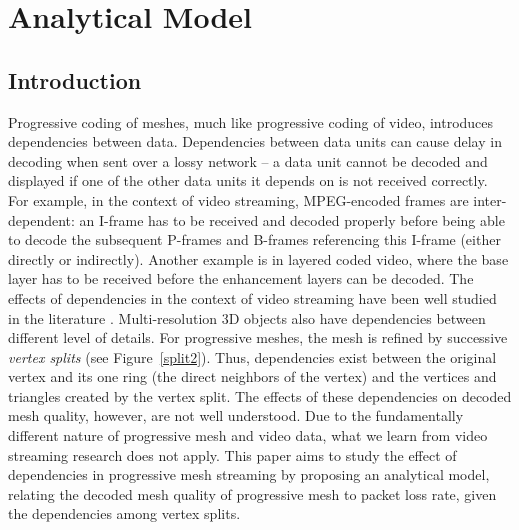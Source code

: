 \chapter{Analytical Model}
\label{c:model}
\def\tracea{UDP-High_result}
\def\traceb{UDP-Low_result}
\def\tracec{DCCP_result}
\def\mesha{Happy}
\def\meshb{Horse}
\def\meshc{Thai}
\def\mesh_h{Happy2}

\section{Introduction}
\label{s:model:intro}
    Progressive coding of meshes, much like progressive coding of
    video, introduces dependencies between data.
    Dependencies between data units can cause delay in decoding
    when sent over a lossy network -- a data unit
    cannot be decoded and displayed if one of the other data units
    it depends on is not received correctly. For example, in the
    context of video streaming, MPEG-encoded frames are inter-dependent:
        an I-frame has to be received and decoded properly
    before being able to decode the subsequent P-frames and B-frames
        referencing this I-frame (either directly or indirectly).  Another
    example is in layered coded video, where the base layer has
    to be received before the enhancement layers can be decoded.
    The effects of dependencies in the context of video streaming
    have been well studied in the literature \cite{boyce98}.   Multi-resolution 3D
    objects also have dependencies between different level of details.
        For progressive meshes, the mesh is refined by successive
    \textit{vertex splits} (see Figure~\ref{split2}).  Thus,
    dependencies exist between the original vertex and its one
    ring (the direct neighbors of the vertex)
    and the vertices and triangles created by the vertex split.
    The effects of these dependencies on decoded mesh quality, however,
    are not well understood.  Due to the fundamentally different
    nature of progressive mesh and video data, what we learn from
    video streaming research does not apply.  This paper aims to study
    the effect of dependencies in progressive mesh streaming by
    proposing an analytical model, relating the decoded mesh quality
    of progressive mesh to packet loss rate, given the dependencies
    among vertex splits.

